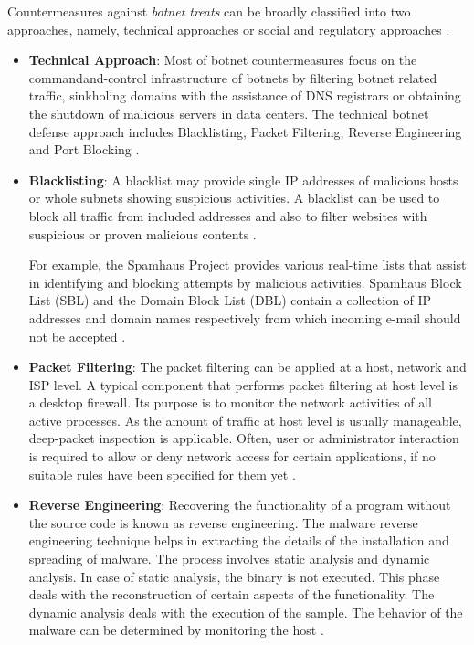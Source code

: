 \documentclass[]{article}
\begin{document}
Countermeasures against \textit{botnet treats} can be broadly classified into two approaches, namely, technical approaches or social and regulatory approaches \cite{article:countermeasures}.

\begin{itemize}
	\item \textbf{Technical Approach}: Most of botnet countermeasures focus on the commandand-control infrastructure of botnets by filtering botnet related traffic, sinkholing domains with the assistance of DNS registrars or obtaining the shutdown of malicious servers in data centers. The technical botnet defense approach includes Blacklisting, Packet Filtering, Reverse Engineering and Port Blocking \cite{article:countermeasures}.
	
	\item{ \textbf{Blacklisting}: A blacklist may provide single IP addresses of malicious hosts or whole subnets showing suspicious activities. A blacklist can be used to block all traffic from included addresses and also to filter websites with suspicious or proven malicious contents \cite{article:countermeasures}.
	
	For example, the Spamhaus Project provides various real-time lists that assist in identifying and blocking attempts by malicious activities. Spamhaus Block List (SBL) and the Domain Block List (DBL) contain a collection of IP addresses and domain names respectively from which incoming e-mail should not be accepted \cite{article:countermeasures}.
}
	\item \textbf{Packet Filtering}: The packet filtering can be applied at a host, network and ISP level. A typical component that performs packet filtering at host level is a desktop firewall. Its purpose is to monitor the network activities of all active processes. As the amount of traffic at host level is usually manageable, deep-packet inspection is applicable. Often, user or administrator interaction is required to allow or deny network access for certain applications, if no suitable rules have been specified for them yet \cite{article:countermeasures}.
	
	\item\textbf{ Reverse Engineering}: Recovering the functionality of a program without the source code is known as reverse engineering. The malware reverse engineering technique helps in extracting the details of the installation and spreading of malware. The process involves static analysis and dynamic analysis. In case of static analysis, the binary is not executed. This phase deals with the reconstruction of certain aspects of the functionality. The dynamic analysis deals with the execution of the sample. The behavior of the malware can be determined by monitoring the host \cite{article:countermeasures}.
	

\end{itemize}
\end{document}
